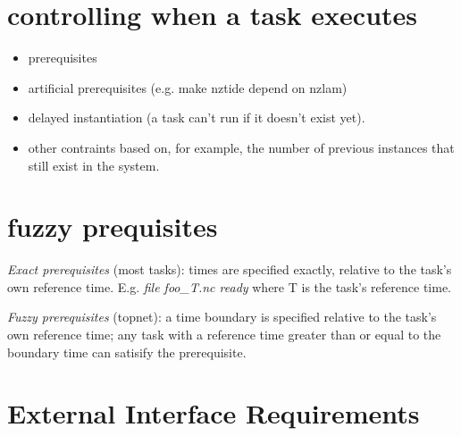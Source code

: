 \documentclass[11pt,a4paper]{report}
\begin{document}
\section{controlling when a task executes}

\begin{itemize}
 \item  prerequisites
 \item artificial prerequisites (e.g. make nztide depend on nzlam)
 \item delayed instantiation (a task can't run if it doesn't exist yet).
 \item other contraints based on, for example, the number of previous
 instances that still exist in the system.
\end{itemize}


\section{fuzzy prequisites}

{\em Exact prerequisites} (most tasks): times are specified exactly,
relative to the task's own reference time.  E.g. {\em file foo\_{T}.nc
ready} where T is the task's reference time.

{\em Fuzzy prerequisites} (topnet): a time boundary is specified
relative to the task's own reference time; any task with a reference
time greater than or equal to the boundary time can satisify the
prerequisite.

\section{External Interface Requirements}
\end{document}
